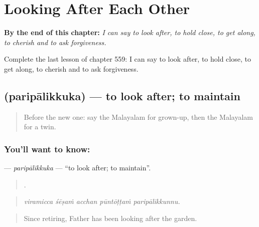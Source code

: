 
\chapter{Looking After Each Other}
\label{ch:ml-looking-after-each-other}

\begin{chapteropening}
\textbf{By the end of this chapter:} \emph{I can say to look after, to hold close, to get along, to cherish and to ask forgiveness.}

Complete the last lesson of chapter 559: I can say to look after, to hold close, to get along, to cherish and to ask forgiveness.
\end{chapteropening}

\section[\texorpdfstring{\ml{പരിപാലിക്കുക} (paripālikkuka)}{പരിപാലിക്കുക (paripālikkuka)}]{ (paripālikkuka) — to look after; to maintain}

\label{lesson:ML-C559-paripalikkuka}



\begin{quote}
Before the new one: say the Malayalam for grown-up, then the Malayalam for a twin.
\end{quote}

\subsection*{You'll want to know: }
\textbf{} — \emph{paripālikkuka} — \textquotedblleft{}to look after; to maintain\textquotedblright{}.

\begin{quote}
    .
\end{quote}

\begin{quote}
\emph{viramicca śēṣaṁ acchan pūntōṭṭaṁ paripālikkunnu.}
\end{quote}

\begin{quote}
Since retiring, Father has been looking after the garden.
\end{quote}

